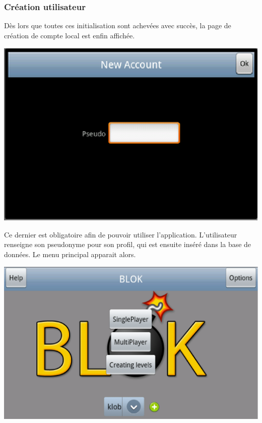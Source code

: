 	\subsubsection{Création utilisateur}
	Dès lors que toutes ces initialisation sont achevées avec succès, la page de
	création de compte local est enfin affichée.
		\begin{center}						
			\includegraphics[scale=0.6]{Developpement/Img/2.eps}
		\end{center} 
	Ce dernier est obligatoire afin de pouvoir utiliser l'application. L'utilisateur renseigne son pseudonyme
	pour son profil, qui est ensuite inséré dans la base de données.
	Le menu principal apparait alors.
	\begin{center}						
			\includegraphics[scale=0.3]{Developpement/Img/3.eps}
		\end{center} 
	
